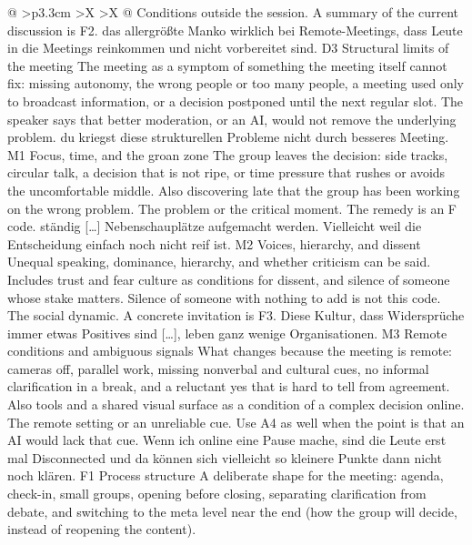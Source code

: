 \begin{xltabular}{\textwidth}{@{}
    >{\RaggedRight\arraybackslash}p{3.3cm}
    >{\RaggedRight\arraybackslash}X
    >{\RaggedRight\arraybackslash}X
  @{}}
  {Conditions outside the session. A summary of the current discussion is F2.}
  {das allergrößte Manko wirklich bei Remote-Meetings, dass Leute in die Meetings reinkommen
  und nicht vorbereitet sind.}
  \cbgap
  \cbrow
  {D3}
  {Structural limits of the meeting}
  {The meeting as a symptom of something the meeting itself cannot fix: missing autonomy,
    the wrong people or too many people, a meeting used only to broadcast information, or a
  decision postponed until the next regular slot.}
  {The speaker says that better moderation, or an AI, would not remove the underlying
  problem.}
  {du kriegst diese strukturellen Probleme nicht durch besseres Meeting.}
  \cbcatbreak
  \cbrow
  {M1}
  {Focus, time, and the groan zone}
  {The group leaves the decision: side tracks, circular talk, a decision that is not ripe,
    or time pressure that rushes or avoids the uncomfortable middle. Also discovering late that
  the group has been working on the wrong problem.}
  {The problem or the critical moment. The remedy is an F code.}
  {ständig [\ldots] Nebenschauplätze aufgemacht werden. Vielleicht weil die Entscheidung
  einfach noch nicht reif ist.}
  \cbgap
  \cbrow
  {M2}
  {Voices, hierarchy, and dissent}
  {Unequal speaking, dominance, hierarchy, and whether criticism can be said. Includes trust
    and fear culture as conditions for dissent, and silence of someone whose stake matters.
  Silence of someone with nothing to add is not this code.}
  {The social dynamic. A concrete invitation is F3.}
  {Diese Kultur, dass Widersprüche immer etwas Positives sind [\ldots], leben ganz wenige
  Organisationen.}
  \cbgap
  \cbrow
  {M3}
  {Remote conditions and ambiguous signals}
  {What changes because the meeting is remote: cameras off, parallel work, missing nonverbal
    and cultural cues, no informal clarification in a break, and a reluctant yes that is hard
    to tell from agreement. Also tools and a shared visual surface as a condition of a complex
  decision online.}
  {The remote setting or an unreliable cue. Use A4 as well when the point is that an AI would
  lack that cue.}
  {Wenn ich online eine Pause mache, sind die Leute erst mal Disconnected und da können sich
  vielleicht so kleinere Punkte dann nicht noch klären.}
  \cbcatbreak
  \cbrow
  {F1}
  {Process structure}
  {A deliberate shape for the meeting: agenda, check-in, small groups, opening before
    closing, separating clarification from debate, and switching to the meta level near the end
  (how the group will decide, instead of reopening the content).}

\end{xltabular}
